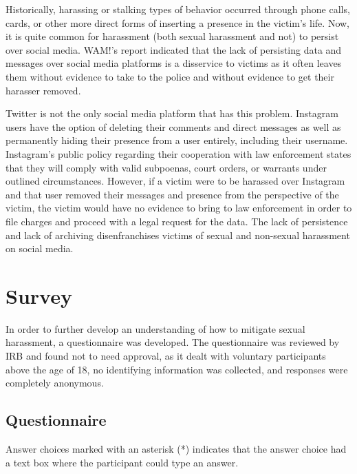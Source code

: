 Historically, harassing or stalking types of behavior occurred through phone calls, cards, or other more direct forms of inserting a presence in the victim's life. Now, it is quite common for harassment (both sexual harassment and not) to persist over social media. WAM!'s report indicated that the lack of persisting data and messages over social media platforms is a disservice to victims as it often leaves them without evidence to take to the police and without evidence to get their harasser removed.

Twitter is not the only social media platform that has this problem. Instagram users have the option of deleting their comments and direct messages as well as permanently hiding their presence from a user entirely, including their username. Instagram's public policy regarding their cooperation with law enforcement states that they will comply with valid subpoenas, court orders, or warrants under outlined circumstances. However, if a victim were to be harassed over Instagram and that user removed their messages and presence from the perspective of the victim, the victim would have no evidence to bring to law enforcement in order to file charges and proceed with a legal request for the data. The lack of persistence and lack of archiving disenfranchises victims of sexual and non-sexual harassment on social media.

\section{Survey}

In order to further develop an understanding of how to mitigate sexual harassment, a questionnaire was developed. The questionnaire was reviewed by IRB and found not to need approval, as it dealt with voluntary participants above the age of 18, no identifying information was collected, and responses were completely anonymous.

\subsection{Questionnaire}

Answer choices marked with an asterisk (*) indicates that the answer choice had a text box where the participant could type an answer.
\hfill \break

